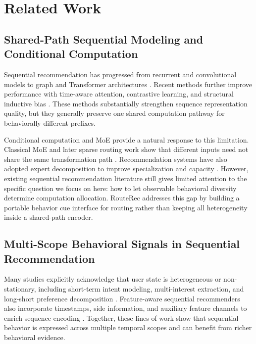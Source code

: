 \documentclass[sigconf,review,anonymous]{acmart}
\begin{document}
\section{Related Work}
\label{sec:related}

\subsection{Shared-Path Sequential Modeling and Conditional Computation}
Sequential recommendation has progressed from recurrent and convolutional models to graph and Transformer architectures \cite{hidasi2016gru4rec,tang2018caser,wu2019srgnn,kang2018sasrec,sun2019bert4rec}. Recent methods further improve performance with time-aware attention, contrastive learning, and structural inductive bias \cite{li2020tisasrec,xie2020cl4srec,wang2023multiplecontrast,qiu2022duorec,du2023fearec,shin2024bsarec,liu2025sigma}. These methods substantially strengthen sequence representation quality, but they generally preserve one shared computation pathway for behaviorally different prefixes.

Conditional computation and MoE provide a natural response to this limitation. Classical MoE and later sparse routing work show that different inputs need not share the same transformation path \cite{jacobs1991adaptive,jordan1994hme,shazeer2017moe,fedus2022switch}. Recommendation systems have also adopted expert decomposition to improve specialization and capacity \cite{ma2018mmoe,tang2020ple,liu2025fame,bian2023m3srec,zhang2025hm4sr}. However, existing sequential recommendation literature still gives limited attention to the specific question we focus on here: how to let observable behavioral diversity determine computation allocation. RouteRec addresses this gap by building a portable behavior cue interface for routing rather than keeping all heterogeneity inside a shared-path encoder.

\subsection{Multi-Scope Behavioral Signals in Sequential Recommendation}
Many studies explicitly acknowledge that user state is heterogeneous or non-stationary, including short-term intent modeling, multi-interest extraction, and long-short preference decomposition \cite{li2017narm,liu2018stamp,ying2018shan,ma2019hgn,li2019mind,cen2020comirec,quadrana2017hrnn}. Feature-aware sequential recommenders also incorporate timestamps, side information, and auxiliary feature channels to enrich sequence encoding \cite{li2020tisasrec,zhang2019fdsa,xie2022difsr,du2023fearec,bauer2024hybridsession}. Together, these lines of work show that sequential behavior is expressed across multiple temporal scopes and can benefit from richer behavioral evidence.
\end{document}
